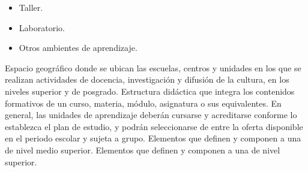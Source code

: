 \begin{bGlosario}
\begin{itemize}
			\item Taller.
			\item Laboratorio.
			\item Otros ambientes de aprendizaje.
		\end{itemize}
	 Espacio geográfico donde se ubican las escuelas, centros y unidades en los que se realizan actividades de docencia, investigación y difusión de la cultura, en los niveles superior y de posgrado.
 	 Estructura didáctica que integra los contenidos formativos de un curso, materia, módulo, asignatura o sus equivalentes. En general, las unidades de aprendizaje deberán cursarse y acreditarse conforme lo establezca el plan de estudio, y podrán seleccionarse de entre la oferta disponible en el periodo escolar y sujeta a grupo. %
 	 Elementos que definen y componen a una  de nivel medio superior.
 	 Elementos que definen y componen a una  de nivel superior.





\end{bGlosario}
